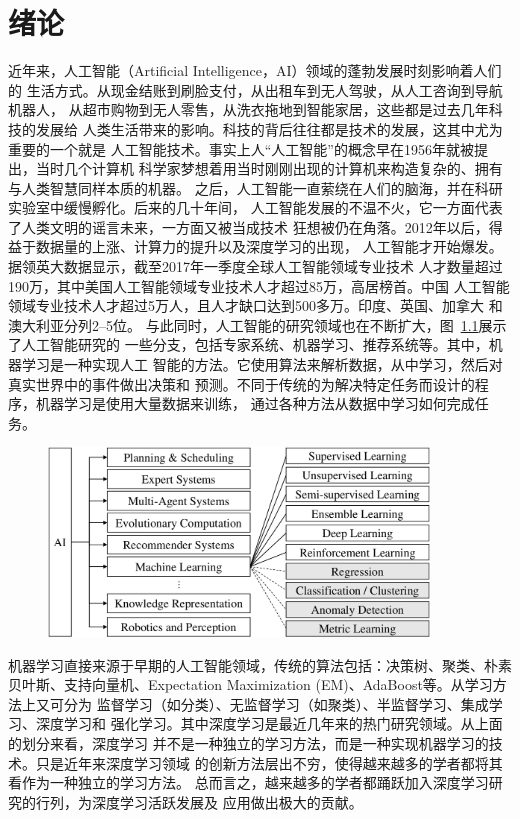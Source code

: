 \chapter{绪论}\label{chap:introduction}
近年来，人工智能（Artificial Intelligence，AI）领域的蓬勃发展时刻影响着人们的
生活方式。从现金结账到刷脸支付，从出租车到无人驾驶，从人工咨询到导航机器人，
从超市购物到无人零售，从洗衣拖地到智能家居，这些都是过去几年科技的发展给
人类生活带来的影响。科技的背后往往都是技术的发展，这其中尤为重要的一个就是
人工智能技术。事实上人``人工智能''的概念早在1956年就被提出，当时几个计算机
科学家梦想着用当时刚刚出现的计算机来构造复杂的、拥有与人类智慧同样本质的机器。
之后，人工智能一直萦绕在人们的脑海，并在科研实验室中缓慢孵化。后来的几十年间，
人工智能发展的不温不火，它一方面代表了人类文明的谣言未来，一方面又被当成技术
狂想被仍在角落。2012年以后，得益于数据量的上涨、计算力的提升以及深度学习的出现，
人工智能才开始爆发。据领英大数据显示，截至2017年一季度全球人工智能领域专业技术
人才数量超过190万，其中美国人工智能领域专业技术人才超过85万，高居榜首。中国
人工智能领域专业技术人才超过5万人，且人才缺口达到500多万。印度、英国、加拿大
和澳大利亚分列2--5位。
与此同时，人工智能的研究领域也在不断扩大，图~\ref{fig:ai}展示了人工智能研究的
一些分支，包括专家系统、机器学习、推荐系统等。其中，机器学习是一种实现人工
智能的方法。它使用算法来解析数据，从中学习，然后对真实世界中的事件做出决策和
预测。不同于传统的为解决特定任务而设计的程序，机器学习是使用大量数据来训练，
通过各种方法从数据中学习如何完成任务。
\begin{figure}[htbp]
  \centering
  \includegraphics[width=0.9\textwidth]{Img/ai-content.pdf}
  \label{fig:ai}
\end{figure}

机器学习直接来源于早期的人工智能领域，传统的算法包括：决策树、聚类、朴素贝叶斯、支持向量机、Expectation Maximization (EM)、AdaBoost等。从学习方法上又可分为
监督学习（如分类）、无监督学习（如聚类）、半监督学习、集成学习、深度学习和
强化学习。其中深度学习是最近几年来的热门研究领域。从上面的划分来看，深度学习
并不是一种独立的学习方法，而是一种实现机器学习的技术。只是近年来深度学习领域
的创新方法层出不穷，使得越来越多的学者都将其看作为一种独立的学习方法。
总而言之，越来越多的学者都踊跃加入深度学习研究的行列，为深度学习活跃发展及
应用做出极大的贡献。

